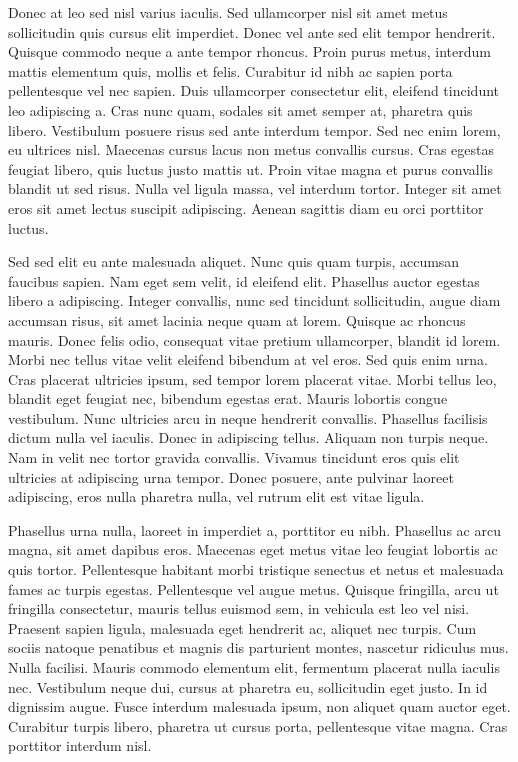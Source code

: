 \documentclass[msc, classic, a4paper]{ufbathesis}
\begin{document}
Donec at leo sed nisl varius iaculis. Sed ullamcorper nisl sit amet metus sollicitudin quis cursus elit imperdiet. Donec vel ante sed elit tempor hendrerit. Quisque commodo neque a ante tempor rhoncus. Proin purus metus, interdum mattis elementum quis, mollis et felis. Curabitur id nibh ac sapien porta pellentesque vel nec sapien. Duis ullamcorper consectetur elit, eleifend tincidunt leo adipiscing a. Cras nunc quam, sodales sit amet semper at, pharetra quis libero. Vestibulum posuere risus sed ante interdum tempor. Sed nec enim lorem, eu ultrices nisl. Maecenas cursus lacus non metus convallis cursus. Cras egestas feugiat libero, quis luctus justo mattis ut. Proin vitae magna et purus convallis blandit ut sed risus. Nulla vel ligula massa, vel interdum tortor. Integer sit amet eros sit amet lectus suscipit adipiscing. Aenean sagittis diam eu orci porttitor luctus.

Sed sed elit eu ante malesuada aliquet. Nunc quis quam turpis, accumsan faucibus sapien. Nam eget sem velit, id eleifend elit. Phasellus auctor egestas libero a adipiscing. Integer convallis, nunc sed tincidunt sollicitudin, augue diam accumsan risus, sit amet lacinia neque quam at lorem. Quisque ac rhoncus mauris. Donec felis odio, consequat vitae pretium ullamcorper, blandit id lorem. Morbi nec tellus vitae velit eleifend bibendum at vel eros. Sed quis enim urna. Cras placerat ultricies ipsum, sed tempor lorem placerat vitae. Morbi tellus leo, blandit eget feugiat nec, bibendum egestas erat. Mauris lobortis congue vestibulum. Nunc ultricies arcu in neque hendrerit convallis. Phasellus facilisis dictum nulla vel iaculis. Donec in adipiscing tellus. Aliquam non turpis neque. Nam in velit nec tortor gravida convallis. Vivamus tincidunt eros quis elit ultricies at adipiscing urna tempor. Donec posuere, ante pulvinar laoreet adipiscing, eros nulla pharetra nulla, vel rutrum elit est vitae ligula.

Phasellus urna nulla, laoreet in imperdiet a, porttitor eu nibh. Phasellus ac arcu magna, sit amet dapibus eros. Maecenas eget metus vitae leo feugiat lobortis ac quis tortor. Pellentesque habitant morbi tristique senectus et netus et malesuada fames ac turpis egestas. Pellentesque vel augue metus. Quisque fringilla, arcu ut fringilla consectetur, mauris tellus euismod sem, in vehicula est leo vel nisi. Praesent sapien ligula, malesuada eget hendrerit ac, aliquet nec turpis. Cum sociis natoque penatibus et magnis dis parturient montes, nascetur ridiculus mus. Nulla facilisi. Mauris commodo elementum elit, fermentum placerat nulla iaculis nec. Vestibulum neque dui, cursus at pharetra eu, sollicitudin eget justo. In id dignissim augue. Fusce interdum malesuada ipsum, non aliquet quam auctor eget. Curabitur turpis libero, pharetra ut cursus porta, pellentesque vitae magna. Cras porttitor interdum nisl.
\end{document}

